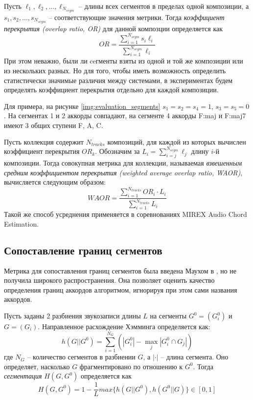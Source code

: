 Пусть $\ell_1, \ell_2, \ldots, \ell_{N_{segm}}$ -- длины всех сегментов в
пределах одной композиции, а $s_1, s_2, \ldots, s_{N_{segm}}$ -- соответствующие
значения метрики. Тогда \emph{коэффициент перекрытия (overlap ratio, OR)} для
данной композции определяется как
\begin{equation} \label{eq:or}
OR = \frac{\sum_{i=1}^{N_{segm}} s_i \ell_i}{\sum_{i=1}^{N_{segm}} \ell_i}
\end{equation}
При этом неважно, были ли ceгменты взяты из одной и той же композиции или из
нескольких разных. Но для того, чтобы иметь возможность определить
статистически значимые различия между системами, в экспериментах будем
определять коэффициент перекрытия отдельно для каждой композиции.

Для примера, на рисунке \ref{img:evaluation_segments} $s_1 = s_2 = s_4 = 1$,
$s_3 = s_5 = 0$. На сегментах 1 и 2 аккорды совпадают, на сегменте 4 аккорды
F:maj и F:maj7 имеют 3 общих ступени F, A, C.

Пусть коллекция содержит $N_{tracks}$ композиций, для каждой из которых
вычислен коэффициент перекрытия $OR_k$. Обозначим за $L_i =
\sum_{i=j}^{N_{segm}} \ell_j$ длину $i$-й композиции. Тогда совокупная метрика
для коллекции, называемая \emph{взвешенным средним коэффициентом перекрытия
(weighted average overlap ratio, WAOR)}, вычисляется следующим образом:
\begin{equation} \label{eq:waor}
WAOR = \frac{\sum_{i=1}^{N_{tracks}} OR_i \cdot L_i}{\sum_{i=1}^{N_{tracks}}
L_i}
\end{equation}
Такой же способ усреднения применяется в соревнованиях MIREX Audio Chord
Estimation.

\subsection{Сопоставление границ сегментов}

Метрика для сопоставления границ сегментов была введена Маухом в
\cite{MauchThesis2010}, но не получила широкого распространения. Она позволяет
оценить качество определения границ аккордов алгоритмом, игнорируя при этом сами
названия аккордов.

Пусть заданы 2 разбиения звукозаписи длины $L$ на сегменты $G^0 = (G_i^0)$ и $G
= (G_i)$. Направленное расхождение Хэмминга определяется как:
$$
h(G||G^0) = \sum_{i=1}^{N_G} \left( |G_i^0| - \underset{j}{\operatorname{max}}
|G_i^0 \cap G_j| \right)
$$
где $N_G$ -- количество сегментов в разбиении $G$, а $| \cdot |$ -- длина
сегмента. Оно определяет, насколько $G$ фрагментировано по отношению к $G^0$.
Тогда \emph{сегментация} $H(G, G^0)$ определяется как
$$H(G, G^0) = 1 - \frac{1}{L} max\{ h(G||G^0), h(G^0||G) \} \in [0,1]$$

